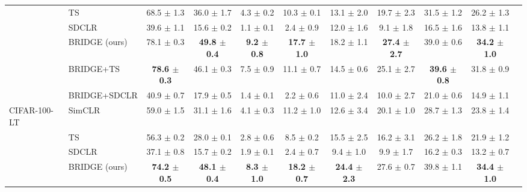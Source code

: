 \begin{table}[t]
\begin{adjustbox}{max width=\textwidth}
\begin{tabular}{l l c c c c c c c c c}
 & TS & 68.5 {\scriptsize$\pm$ 1.3} & 36.0 {\scriptsize$\pm$ 1.7} & 4.3 {\scriptsize$\pm$ 0.2} & 10.3 {\scriptsize$\pm$ 0.1} & 13.1 {\scriptsize$\pm$ 2.0} & 19.7 {\scriptsize$\pm$ 2.3} & 31.5 {\scriptsize$\pm$ 1.2} & 26.2 {\scriptsize$\pm$ 1.3} \\
 & SDCLR & 39.6 {\scriptsize$\pm$ 1.1} & 15.6 {\scriptsize$\pm$ 0.2} & 1.1 {\scriptsize$\pm$ 0.1} & 2.4 {\scriptsize$\pm$ 0.9} & 12.0 {\scriptsize$\pm$ 1.6} & 9.1 {\scriptsize$\pm$ 1.8} & 16.5 {\scriptsize$\pm$ 1.6} & 13.8 {\scriptsize$\pm$ 1.1} \\
 & \rowcolor{blue!10} BRIDGE (ours) & 78.1 {\scriptsize$\pm$ 0.3} & \textbf{49.8 {\scriptsize$\pm$ 0.4}} & \textbf{9.2 {\scriptsize$\pm$ 0.8}} & \textbf{17.7 {\scriptsize$\pm$ 1.0}} & 18.2 {\scriptsize$\pm$ 1.1} & \textbf{27.4 {\scriptsize$\pm$ 2.7}} & 39.0 {\scriptsize$\pm$ 0.6} & \textbf{34.2 {\scriptsize$\pm$ 1.0}} \\
 & BRIDGE+TS & \textbf{78.6 {\scriptsize$\pm$ 0.3}} & 46.1 {\scriptsize$\pm$ 0.3} & 7.5 {\scriptsize$\pm$ 0.9} & 11.1 {\scriptsize$\pm$ 0.7} & 14.5 {\scriptsize$\pm$ 0.6} & 25.1 {\scriptsize$\pm$ 2.7} & \textbf{39.6 {\scriptsize$\pm$ 0.8}} & 31.8 {\scriptsize$\pm$ 0.9} \\
 & BRIDGE+SDCLR & 40.9 {\scriptsize$\pm$ 0.7} & 17.9 {\scriptsize$\pm$ 0.5} & 1.4 {\scriptsize$\pm$ 0.1} & 2.2 {\scriptsize$\pm$ 0.6} & 11.0 {\scriptsize$\pm$ 2.4} & 10.0 {\scriptsize$\pm$ 2.7} & 21.0 {\scriptsize$\pm$ 0.6} & 14.9 {\scriptsize$\pm$ 1.1} \\
\midrule
CIFAR-100-LT & SimCLR & 59.0 {\scriptsize$\pm$ 1.5} & 31.1 {\scriptsize$\pm$ 1.6} & 4.1 {\scriptsize$\pm$ 0.3} & 11.2 {\scriptsize$\pm$ 1.0} & 12.6 {\scriptsize$\pm$ 3.4} & 20.1 {\scriptsize$\pm$ 1.0} & 28.7 {\scriptsize$\pm$ 1.3} & 23.8 {\scriptsize$\pm$ 1.4} \\
 & TS & 56.3 {\scriptsize$\pm$ 0.2} & 28.0 {\scriptsize$\pm$ 0.1} & 2.8 {\scriptsize$\pm$ 0.6} & 8.5 {\scriptsize$\pm$ 0.2} & 15.5 {\scriptsize$\pm$ 2.5} & 16.2 {\scriptsize$\pm$ 3.1} & 26.2 {\scriptsize$\pm$ 1.8} & 21.9 {\scriptsize$\pm$ 1.2} \\
 & SDCLR & 37.1 {\scriptsize$\pm$ 0.8} & 15.7 {\scriptsize$\pm$ 0.2} & 1.9 {\scriptsize$\pm$ 0.1} & 2.4 {\scriptsize$\pm$ 0.7} & 9.4 {\scriptsize$\pm$ 1.0} & 9.9 {\scriptsize$\pm$ 1.7} & 16.2 {\scriptsize$\pm$ 0.3} & 13.2 {\scriptsize$\pm$ 0.7} \\
 & \rowcolor{blue!10} BRIDGE (ours) & \textbf{74.2 {\scriptsize$\pm$ 0.5}} & \textbf{48.1 {\scriptsize$\pm$ 0.4}} & \textbf{8.3 {\scriptsize$\pm$ 1.0}} & \textbf{18.2 {\scriptsize$\pm$ 0.7}} & \textbf{24.4 {\scriptsize$\pm$ 2.3}} & 27.6 {\scriptsize$\pm$ 0.7} & 39.8 {\scriptsize$\pm$ 1.1} & \textbf{34.4 {\scriptsize$\pm$ 1.0}} \\

\end{tabular}
\end{adjustbox}
\end{table}
